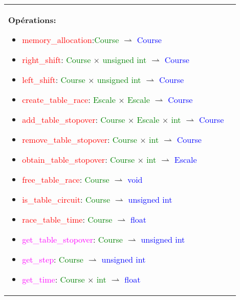 \documentclass[a4paper, 11pt, oneside]{article}
\begin{document}
\begin{tabular}{|p{17cm}|c}
				\textbf{Opérations\footnotemark{}:}
					\begin{itemize}
						\item[] \textcolor{red}{memory\_allocation}:\textcolor{green}{Course} $\rightharpoonup$ \textcolor{blue}{Course}
						\item[] \textcolor{red}{right\_shift}: \textcolor{green}{Course} $\times$ \textcolor{green}{unsigned int} $\rightharpoonup$ \textcolor{blue}{Course}
						\item[] \textcolor{red}{left\_shift}: \textcolor{green}{Course} $\times$ \textcolor{green}{unsigned int} $\rightharpoonup$ \textcolor{blue}{Course}
						\item[] \textcolor{red}{create\_table\_race}: \textcolor{green}{Escale} $\times$ \textcolor{green}{Escale} $\rightharpoonup$ \textcolor{blue}{Course}
						\item[] \textcolor{red}{add\_table\_stopover}: \textcolor{green}{Course} $\times$ \textcolor{green}{Escale} $\times$ \textcolor{green}{int} $\rightharpoonup$ \textcolor{blue}{Course}
						\item[] \textcolor{red}{remove\_table\_stopover}: \textcolor{green}{Course} $\times$ \textcolor{green}{int} $\rightharpoonup$ \textcolor{blue}{Course}
						\item[] \textcolor{red}{obtain\_table\_stopover}: \textcolor{green}{Course} $\times$ \textcolor{green}{int} $\rightharpoonup$ \textcolor{blue}{Escale}
						\item[] \textcolor{red}{free\_table\_race}: \textcolor{green}{Course} $\rightharpoonup$ \textcolor{blue}{void}
						\item[] \textcolor{red}{is\_table\_circuit}: \textcolor{green}{Course} $\rightharpoonup$ \textcolor{blue}{unsigned int}
						\item[] \textcolor{red}{race\_table\_time}: \textcolor{green}{Course} $\rightharpoonup$ \textcolor{blue}{float}
						\item[] \textcolor{magenta}{get\_table\_stopover}: \textcolor{green}{Course} $\rightharpoonup$ \textcolor{blue}{unsigned int}
						\item[] \textcolor{magenta}{get\_step}: \textcolor{green}{Course} $\rightharpoonup$ \textcolor{blue}{unsigned int}
						\item[] \textcolor{magenta}{get\_time}: \textcolor{green}{Course} $\times$ \textcolor{green}{int} $\rightharpoonup$ \textcolor{blue}{float}
					\end{itemize}
				

\end{tabular}
\end{document}
